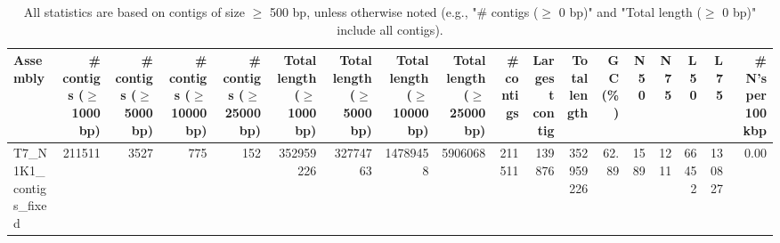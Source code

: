 \documentclass[12pt,a4paper]{article}
\begin{document}
\begin{table}[ht]
\begin{center}
\caption{All statistics are based on contigs of size $\geq$ 500 bp, unless otherwise noted (e.g., "\# contigs ($\geq$ 0 bp)" and "Total length ($\geq$ 0 bp)" include all contigs).}
\begin{tabular}{|l*{17}{|r}|}
\hline
Assembly & \# contigs ($\geq$ 1000 bp) & \# contigs ($\geq$ 5000 bp) & \# contigs ($\geq$ 10000 bp) & \# contigs ($\geq$ 25000 bp) & Total length ($\geq$ 1000 bp) & Total length ($\geq$ 5000 bp) & Total length ($\geq$ 10000 bp) & Total length ($\geq$ 25000 bp) & \# contigs & Largest contig & Total length & GC (\%) & N50 & N75 & L50 & L75 & \# N's per 100 kbp \\ \hline
T7\_N1K1\_contigs\_fixed & 211511 & 3527 & 775 & 152 & 352959226 & 32774763 & 14789458 & 5906068 & 211511 & 139876 & 352959226 & 62.89 & 1589 & 1211 & 66452 & 130827 & 0.00 \\ \hline
\end{tabular}
\end{center}
\end{table}
\end{document}
